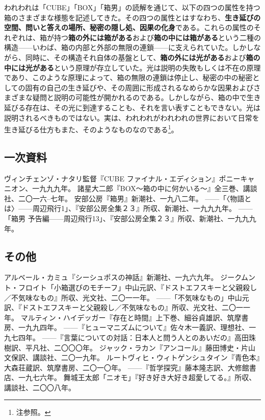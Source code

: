 \documentclass[9pt,b5j,twoside,twocolumn]{utarticle}
\begin{document}
われわれは「CUBE」「BOX」「箱男」の読解を通じて、以下の四つの属性を持つ箱のさまざまな様態を記述してきた。その四つの属性とはすなわち、\textbf{生き延びの空間、問いと答えの場所、秘密の隠し処、因果の化身}である。これらの属性のそれぞれは、箱が持つ\textbf{箱の外には箱がある}および\textbf{箱の中には箱がある}という二種の構造------いわば、箱の内部と外部の無限の連鎖------に支えられていた。しかしながら、同時に、その構造それ自体の基盤として、\textbf{箱の外には光がある}および\textbf{箱の中には光がある}という原理が存立していた。光は説明の失敗もしくは不在の原理であり、このような原理によって、箱の無限の連鎖は停止し、秘密の中の秘密としての固有の自己の生き延びや、その周囲に形成されるなめらかな因果およびさまざまな疑問と説明の可能性が開かれるのである。しかしながら、箱の中で生き延びる存在は、その光に到達することも、それを言い表すこともできない。光は説明されるべきものではない。実は、われわれがわれわれの世界において日常を生き延びる仕方もまた、そのようなものなのである\footnote{注参照。}。
\clearpage
\theendnotes
\begin{thebibliography}{99}
{\small
\subsection*{一次資料}
ヴィンチェンゾ・ナタリ監督『CUBE ファイナル・エディション』ポニーキャニオン、一九九九年。
諸星大二郎『BOX～箱の中に何かいる～』全三巻、講談社、二〇一六--七年。
安部公房『箱男』新潮社、一九八二年。
------「〈物語とは〉------周辺飛行1」、『安部公房全集２３』所収、新潮社、一九九九年。
------「箱男 予告編------周辺飛行13」、『安部公房全集２３』所収、新潮社、一九九九年。
\subsection*{その他}
アルベール・カミュ『シーシュポスの神話』新潮社、一九六九年。
ジークムント・フロイト「小箱選びのモチーフ」中山元訳、『ドストエフスキーと父親殺し／不気味なもの』所収、光文社、二〇一一年。
------「不気味なもの」中山元訳、『ドストエフスキーと父親殺し／不気味なもの』所収、光文社、二〇一一年。
マルティン・ハイデッガー『存在と時間』上下巻、細谷貞雄訳、筑摩書房、一九九四年。
------『ヒューマニズムについて』佐々木一義訳、理想社、一九七四年。
------『言葉についての対話：日本人と問う人とのあいだの』高田珠樹訳、平凡社、二〇〇〇年。
ジャック・ラカン『アンコール』藤田博史・片山文保訳、講談社、二〇一九年。
ルートヴィヒ・ウィトゲンシュタイン『青色本』大森荘蔵訳、筑摩書房、二〇一〇年。
------『哲学探究』藤本隆志訳、大修館書店、一九七六年。
舞城王太郎「ニオモ」『好き好き大好き超愛してる。』所収、講談社、二〇〇八年。
}
\end{thebibliography}
\end{document}
